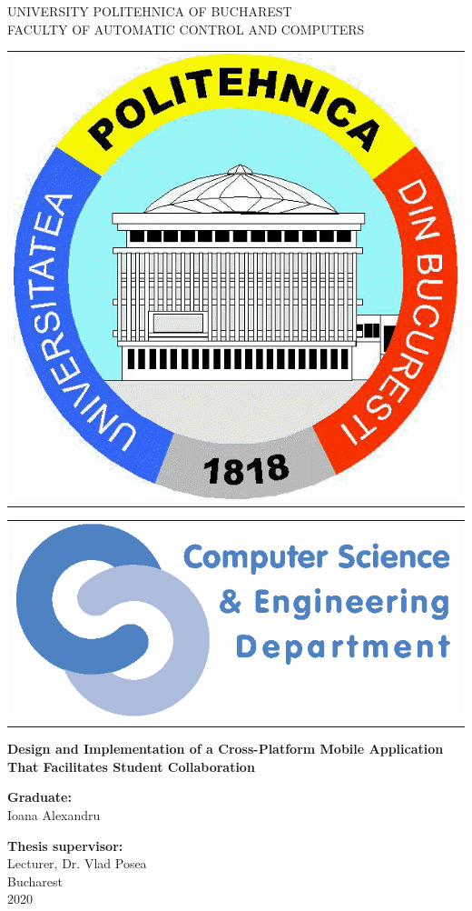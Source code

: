 \thispagestyle{empty}
\begin{center}
\large
UNIVERSITY POLITEHNICA OF BUCHAREST \\
FACULTY OF AUTOMATIC CONTROL AND COMPUTERS \\

\begin{tabular}[t]{@{}l}
	\includegraphics[scale=0.16]{figures/logos/upb.png}
\end{tabular}
\hfill
\begin{tabular}[t]{l@{}}
	\includegraphics[scale=0.3]{figures/logos/cse.png}
\end{tabular}
\vfill\noindent

{\LARGE
	\textbf{Design and Implementation of a Cross-Platform Mobile Application That Facilitates Student Collaboration}
}

\vspace{3cm}
\textbf{Graduate:}\\
Ioana Alexandru

\bigskip
\bigskip

\textbf{Thesis supervisor:}\\
Lecturer, Dr. Vlad Posea \\

Bucharest \\
2020 \\
\vspace*{1cm}
\end{center}
